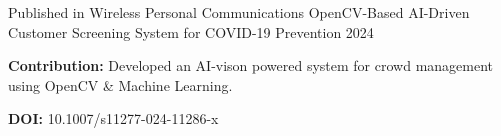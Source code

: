 

\begin{cventries}

  \cventry
    {Published in Wireless Personal Communications} %
    {OpenCV-Based AI-Driven Customer Screening System for COVID-19 Prevention} %
    {} %
    {2024} %
    {
      \begin{cvitems} %
        \item {\textbf{Contribution:} Developed an AI-vison powered system for crowd management using OpenCV \& Machine Learning.}
        \item {\textbf{DOI:} 10.1007/s11277-024-11286-x}
      \end{cvitems}
    }



\end{cventries}
